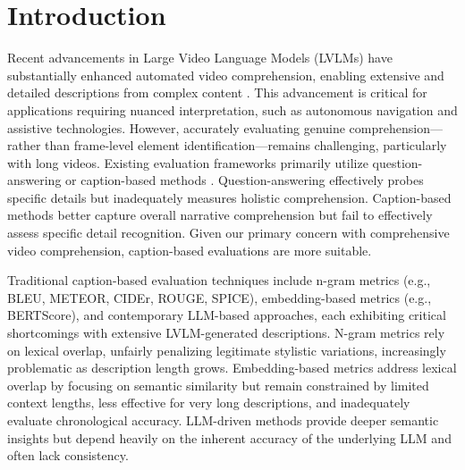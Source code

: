 \documentclass[letterpaper]{article} %
\begin{document}
\section{Introduction}

Recent advancements in Large Video Language Models (LVLMs) have substantially enhanced automated video comprehension, enabling extensive and detailed descriptions from complex content \citep{Yuan2025Tarsier2, Shen2025LongVU, Shu2025VideoXL, Chen2025LongVILA, Ataallah2024Goldfish, Weng2024LongVLM, He2024MALMM, Cheng2024LongVideoLLaMA, Chen2024VideoLLMonline, Ren2024TimeChat, Qian2024VideoStreaming}. This advancement is critical for applications requiring nuanced interpretation, such as autonomous navigation and assistive technologies. However, accurately evaluating genuine comprehension—rather than frame-level element identification—remains challenging, particularly with long videos. Existing evaluation frameworks primarily utilize question-answering or caption-based methods \citep{wu2024longvideobench, ataallah2024infinibench, du2024eventoriented, fang2024mmbenchvideolongformmultishotbenchmark, nagrani2025neptune, wang2024lvbench, zhao2024videoniah, zhou2025mlvu, fu2025videomme, mangalam2023egoschema, li2024mvbench}. Question-answering effectively probes specific details but inadequately measures holistic comprehension. Caption-based methods better capture overall narrative comprehension but fail to effectively assess specific detail recognition. Given our primary concern with comprehensive video comprehension, caption-based evaluations are more suitable.

Traditional caption-based evaluation techniques include n-gram metrics (e.g., BLEU, METEOR, CIDEr, ROUGE, SPICE), embedding-based metrics (e.g., BERTScore), and contemporary LLM-based approaches, each exhibiting critical shortcomings with extensive LVLM-generated descriptions. N-gram metrics rely on lexical overlap, unfairly penalizing legitimate stylistic variations, increasingly problematic as description length grows. Embedding-based metrics address lexical overlap by focusing on semantic similarity but remain constrained by limited context lengths, less effective for very long descriptions, and inadequately evaluate chronological accuracy. LLM-driven methods provide deeper semantic insights but depend heavily on the inherent accuracy of the underlying LLM and often lack consistency.
\end{document}
